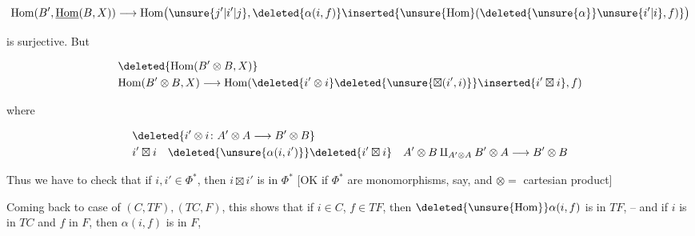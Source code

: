 \[
\mathrm{Hom}(B',\underline{\mathrm{Hom}}(B,X))\longrightarrow
\mathrm{Hom}\bigl(\unsure{j'|i'|j},\deleted{\alpha(i,f)}\inserted{\unsure{\mathrm{Hom}}(\deleted{\unsure{\alpha}}\unsure{i'|i},f)}\bigr)
\]

is surjective. But  

\[
\begin{aligned}
&\deleted{\mathrm{Hom}(B'\otimes B,X)}\\
&\mathrm{Hom}(B'\otimes B,X)\longrightarrow\mathrm{Hom}(\deleted{i'\otimes i}\deleted{\unsure{\boxtimes(i',i)}}\inserted{i'\boxtimes i},f)
\end{aligned}
\]


where

\[
\begin{aligned}
&\deleted{i'\otimes i\colon A'\otimes A\longrightarrow B'\otimes B}\\
&i'\boxtimes i\quad \deleted{\unsure{\alpha(i,i')}}\deleted{i'\boxtimes i}\quad A'\otimes B\amalg_{A'\otimes A}B'\otimes A\longrightarrow B'\otimes B
\end{aligned}
\]

 Thus we have to check that if $i,i'\in\Phi^{*}$, then $i\boxtimes i'$ is in $\Phi^{*}$ [OK if $\Phi^{*}$ are monomorphisms, say, and $\otimes=$ cartesian product]


Coming back to case of $(C,TF),(TC,F)$, this shows that if $i\in C$, $f\in TF$, then $\deleted{\unsure{\mathrm{Hom}}}\alpha(i,f)$ is in $TF$, -- and if $i$ is in $TC$ and $f$ in $F$, then $\alpha(i,f)$ is in $F$,

